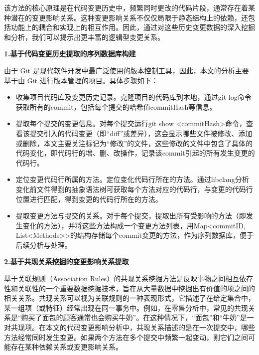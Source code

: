 该方法的核心原理是在代码变更历史中，频繁同时更改的代码片段，通常存在着某种潜在的变更影响关系。这种变更影响关系不仅仅局限于静态结构上的依赖，还包括功能上的耦合和实现上的相互作用。因此，通过对这些历史变更数据的深入挖掘和分析，我们可以揭示出更丰富的逻辑型变更关系。

\noindent \textbf{1.基于代码变更历史提取的序列数据库构建}

由于 Git 是现代软件开发中最广泛使用的版本控制工具，因此，本文的分析主要基于由 Git 进行版本管理的项目。具体步骤如下：

\begin{itemize}
    \item 收集项目代码库及变更历史记录。克隆项目的代码库到本地，通过git log命令获取所有的commit，包括每个提交的哈希值commitHash等信息。
    \item 提取每个提交的变更信息。对每个提交运行git show <commitHash>命令，查看该提交引入的代码变更（即“diff”或差异），这会显示哪些文件被修改、添加或删除，本文主要关注标记为“修改”的文件，这些修改的文件中包含了具体的代码变化，即代码行的增、删、改操作，记录该commit引起的所有发生变更的代码行。
    \item 定位变更代码行所属的方法。定位变化代码行所在的方法。通过libclang分析变化前文件得到的抽象语法树可获取每个方法对应的代码行，与变更的代码行位置进行匹配，得到变更的代码行所在的方法。
    \item 提取变更方法与提交的关系。对于每个提交，提取出所有受影响的方法（即发生变化的方法），并将这些方法构成一个变更方法列表，用Map<commitID, List<Methods>>的结构存储每个commit变更的方法，作为序列数据库，便于后续分析与处理。
    
\end{itemize}

\noindent \textbf{2.基于共现关系挖掘的变更影响关系提取}

基于关联规则（Association Rules）的共现关系挖掘方法是反映事物之间相互依存性和关联性的一个重要数据挖掘技术，旨在从大量数据中挖掘出有价值的项之间的相关关系。共现关系可以视为关联规则的一种表现形式，它描述了在给定集合中，某一组项（或特征）经常出现在同一事务中。例如，在零售分析中，常见的共现关系是“购买了面包的顾客通常也会购买牛奶”。在这种情况下，“面包”和“牛奶”是一对共现项。在本文的代码变更影响分析中，共现关系描述的是在一次提交中，哪些方法经常同时发生变更。如果两个方法在多个提交中频繁一起变动，则它们之间可能存在某种依赖关系或变更影响关系。

